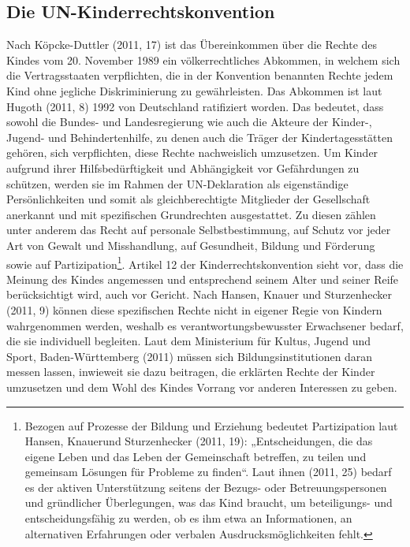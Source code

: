 \subsection{Die UN-Kinderrechtskonvention}

Nach Köpcke-Duttler (2011, 17) ist das Übereinkommen über die Rechte des Kindes vom 20. November 1989 ein völkerrechtliches Abkommen, in welchem sich die Vertragsstaaten verpflichten, die in der Konvention benannten Rechte jedem Kind ohne jegliche Diskriminierung zu gewährleisten. Das Abkommen ist laut Hugoth (2011, 8) 1992 von Deutschland ratifiziert worden. Das bedeutet, dass sowohl die Bundes- und Landesregierung wie auch die Akteure der Kinder-, Jugend- und Behindertenhilfe, zu denen auch die Träger der Kindertagesstätten gehören, sich verpflichten, diese Rechte nachweislich umzusetzen. Um Kinder aufgrund ihrer Hilfsbedürftigkeit und Abhängigkeit vor Gefährdungen zu schützen, werden sie im Rahmen der UN-Deklaration als eigenständige Persönlichkeiten und somit als gleichberechtigte Mitglieder der Gesellschaft anerkannt und mit spezifischen Grundrechten ausgestattet. Zu diesen zählen unter anderem das Recht auf personale Selbstbestimmung, auf Schutz vor jeder Art von Gewalt und Miss\-handlung, auf Gesundheit, Bildung und Förderung sowie auf Partizipation\footnote{Bezogen auf Prozesse der Bildung und Erziehung bedeutet Partizipation laut Hansen, Knauerund Sturzenhecker (2011, 19): „Entscheidungen, die das eigene Leben und das Leben der Gemeinschaft betreffen, zu teilen und gemeinsam Lösungen für Probleme zu finden“. Laut ihnen (2011, 25) bedarf es der aktiven Unterstützung seitens der Bezugs- oder Betreuungspersonen und gründlicher  Überlegungen, was das Kind braucht, um beteiligungs- und entscheidungsfähig zu werden, ob es ihm etwa an Informationen, an alternativen Erfahrungen oder verbalen Ausdrucksmöglichkeiten fehlt.}. 
Artikel 12 der Kinderrechtskonvention sieht vor, dass die Meinung des Kindes angemessen und entsprechend seinem Alter und seiner Reife berücksichtigt wird, auch vor Gericht. Nach Hansen, Knauer und Sturzenhecker (2011, 9) können diese spezifischen Rechte nicht in eigener Regie von Kindern wahrgenommen werden, weshalb es verantwortungsbewusster Erwachsener bedarf, die sie individuell begleiten. Laut dem Ministerium für Kultus, Jugend und Sport, Baden-Württemberg (2011) müssen sich Bildungsinstitutionen daran messen lassen, inwieweit sie dazu beitragen, die erklärten Rechte der Kinder umzusetzen und dem Wohl des Kindes Vorrang vor anderen Interessen zu geben.

